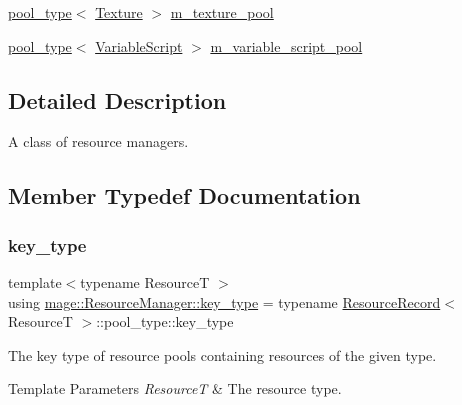 \begin{DoxyCompactItemize}
\item 
\hyperlink{classmage_1_1_resource_manager_a4416f0a710790d8aa2d0bc006764695a}{pool\+\_\+type}$<$ \hyperlink{classmage_1_1_texture}{Texture} $>$ \hyperlink{classmage_1_1_resource_manager_a28913331d5e5ac747df30c058c9263c4}{m\+\_\+texture\+\_\+pool}
\item 
\hyperlink{classmage_1_1_resource_manager_a4416f0a710790d8aa2d0bc006764695a}{pool\+\_\+type}$<$ \hyperlink{classmage_1_1_variable_script}{Variable\+Script} $>$ \hyperlink{classmage_1_1_resource_manager_a8f1826ab2392b60265afe5ba1ef2c4ed}{m\+\_\+variable\+\_\+script\+\_\+pool}
\end{DoxyCompactItemize}


\subsection{Detailed Description}
A class of resource managers. 

\subsection{Member Typedef Documentation}
\hypertarget{classmage_1_1_resource_manager_a5109dfe000a336d9fd2d467ba3dda5a1}{}\label{classmage_1_1_resource_manager_a5109dfe000a336d9fd2d467ba3dda5a1} 
\subsubsection{\texorpdfstring{key\+\_\+type}{key\_type}}
{\footnotesize\ttfamily template$<$typename ResourceT $>$ \\
using \hyperlink{classmage_1_1_resource_manager_a5109dfe000a336d9fd2d467ba3dda5a1}{mage\+::\+Resource\+Manager\+::key\+\_\+type} =  typename \hyperlink{structmage_1_1_resource_manager_1_1_resource_record}{Resource\+Record}$<$ ResourceT $>$\+::pool\+\_\+type\+::key\+\_\+type}

The key type of resource pools containing resources of the given type.


\begin{DoxyTemplParams}{Template Parameters}
{\em ResourceT} & The resource type. \\
\hline
\end{DoxyTemplParams}
\hypertarget{classmage_1_1_resource_manager_a4416f0a710790d8aa2d0bc006764695a}{}\label{classmage_1_1_resource_manager_a4416f0a710790d8aa2d0bc006764695a} 
